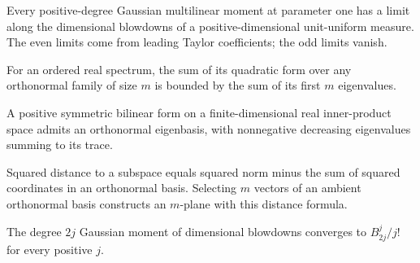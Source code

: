 \begin{lemma}
\label{lem:blowdown-form-limits}

Every positive-degree Gaussian multilinear moment at parameter one has a limit along the dimensional blowdowns of a positive-dimensional unit-uniform measure. The even limits come from leading Taylor coefficients; the odd limits vanish.
\end{lemma}

\begin{lemma}
\label{lem:orthonormal-spectral-sum-bound}

For an ordered real spectrum, the sum of its quadratic form over any orthonormal family of size $m$ is bounded by the sum of its first $m$ eigenvalues.
\end{lemma}

\begin{lemma}
\label{lem:ordered-bilinear-spectrum}

A positive symmetric bilinear form on a finite-dimensional real inner-product space admits an orthonormal eigenbasis, with nonnegative decreasing eigenvalues summing to its trace.
\end{lemma}

\begin{lemma}
\label{lem:orthonormal-plane-distance}

Squared distance to a subspace equals squared norm minus the sum of squared coordinates in an orthonormal basis. Selecting $m$ vectors of an ambient orthonormal basis constructs an $m$-plane with this distance formula.
\end{lemma}

\begin{lemma}
\label{lem:blowdown-even-moment-limit}

The degree $2j$ Gaussian moment of dimensional blowdowns converges to $B_{2j}^{j}/j!$ for every positive $j$.
\end{lemma}

